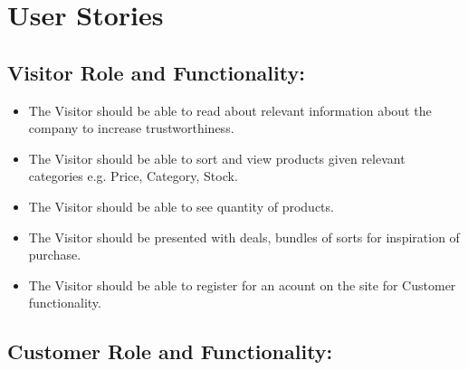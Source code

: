 \section{User Stories}\label{app:user_stories}

\subsection{Visitor Role and Functionality:}

\begin{itemize}
    \item The Visitor should be able to read about relevant information
    about the company to increase trustworthiness.
    \item The Visitor should be able to sort and view  products given
    relevant categories e.g. Price, Category, Stock.
    \item The Visitor should be able to see quantity of products. 
    \item The Visitor should be presented with deals, bundles of sorts for
    inspiration of purchase.
    \item The Visitor should be able to register for an acount on the site for Customer functionality.
\end{itemize}


\subsection{Customer Role and Functionality:}

